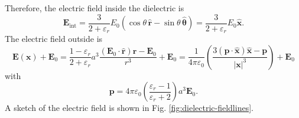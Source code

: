Therefore, the electric field inside the dielectric is
\begin{equation}
    \mathbf{E}_{\text{int}} = \frac{3}{2+\varepsilon_r}E_0(\cos\theta\,\hat{\mathbf{r}} - \sin\theta\,\hat{\mathbf{\theta}}) = \frac{3}{2+\varepsilon_r}E_0\hat{\mathbf{x}}.
\end{equation}
The electric field outside is
\begin{equation}
    \mathbf{E}(\mathbf{x}) +\mathbf{E}_0 =\frac{1-\varepsilon_r}{2+\varepsilon_r}a^3\frac{(\mathbf{E}_0\cdot\hat{\mathbf{r}})\mathbf{r}-\mathbf{E}_0}{r^3} + \mathbf{E}_0 =\frac{1}{4\pi\varepsilon_0}
  \left(\frac{3(\mathbf{p}\cdot\hat{\mathbf{x}})\hat{\mathbf{x}}-\mathbf{p}}{|\mathbf{x}|^3}\right) + \mathbf{E}_0
\end{equation}
with
\begin{equation}
  \mathbf{p} = 4\pi\varepsilon_0\!\left(\frac{\varepsilon_r-1}{\varepsilon_r+2}\right)a^3\mathbf{E}_0.
\end{equation}
A sketch of the electric field is shown in Fig. \ref{fig:dielectric-fieldlines}.
